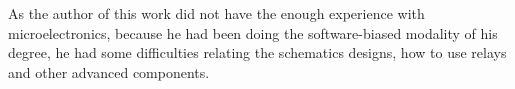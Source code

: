 
As the author of this work did not have the enough experience with microelectronics,
because he had been doing the software-biased modality of his degree,
he had some difficulties relating the schematics designs,
how to use relays and other advanced components.
